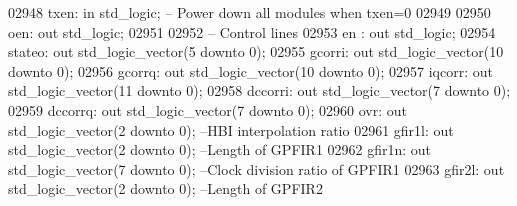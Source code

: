 \begin{DoxyCode}
02948         txen: \textcolor{keywordflow}{in} \textcolor{comment}{std\_logic}; \textcolor{keyword}{-- Power down all modules when txen=0}
02949         
02950         oen: \textcolor{keywordflow}{out} \textcolor{comment}{std\_logic};
02951         
02952 \textcolor{keyword}{        -- Control lines        }
02953         en      : \textcolor{keywordflow}{out} \textcolor{comment}{std\_logic};
02954         stateo: \textcolor{keywordflow}{out} \textcolor{comment}{std\_logic\_vector}(\textcolor{vhdllogic}{}\textcolor{vhdllogic}{5} \textcolor{keywordflow}{downto} \textcolor{vhdllogic}{}\textcolor{vhdllogic}{0});
02955         gcorri: \textcolor{keywordflow}{out} \textcolor{comment}{std\_logic\_vector}(\textcolor{vhdllogic}{}\textcolor{vhdllogic}{10} \textcolor{keywordflow}{downto} \textcolor{vhdllogic}{}\textcolor{vhdllogic}{0});
02956         gcorrq: \textcolor{keywordflow}{out} \textcolor{comment}{std\_logic\_vector}(\textcolor{vhdllogic}{}\textcolor{vhdllogic}{10} \textcolor{keywordflow}{downto} \textcolor{vhdllogic}{}\textcolor{vhdllogic}{0});
02957         iqcorr: \textcolor{keywordflow}{out} \textcolor{comment}{std\_logic\_vector}(\textcolor{vhdllogic}{}\textcolor{vhdllogic}{11} \textcolor{keywordflow}{downto} \textcolor{vhdllogic}{}\textcolor{vhdllogic}{0});
02958         dccorri: \textcolor{keywordflow}{out} \textcolor{comment}{std\_logic\_vector}(\textcolor{vhdllogic}{}\textcolor{vhdllogic}{7} \textcolor{keywordflow}{downto} \textcolor{vhdllogic}{}\textcolor{vhdllogic}{0});
02959         dccorrq: \textcolor{keywordflow}{out} \textcolor{comment}{std\_logic\_vector}(\textcolor{vhdllogic}{}\textcolor{vhdllogic}{7} \textcolor{keywordflow}{downto} \textcolor{vhdllogic}{}\textcolor{vhdllogic}{0});
02960         ovr: \textcolor{keywordflow}{out} \textcolor{comment}{std\_logic\_vector}(\textcolor{vhdllogic}{}\textcolor{vhdllogic}{2} \textcolor{keywordflow}{downto} \textcolor{vhdllogic}{}\textcolor{vhdllogic}{0});  \textcolor{keyword}{--HBI interpolation ratio }
02961         gfir1l: \textcolor{keywordflow}{out} \textcolor{comment}{std\_logic\_vector}(\textcolor{vhdllogic}{}\textcolor{vhdllogic}{2} \textcolor{keywordflow}{downto} \textcolor{vhdllogic}{}\textcolor{vhdllogic}{0});       \textcolor{keyword}{--Length of GPFIR1}
02962         gfir1n: \textcolor{keywordflow}{out} \textcolor{comment}{std\_logic\_vector}(\textcolor{vhdllogic}{}\textcolor{vhdllogic}{7} \textcolor{keywordflow}{downto} \textcolor{vhdllogic}{}\textcolor{vhdllogic}{0});       \textcolor{keyword}{--Clock division ratio of GPFIR1}
02963         gfir2l: \textcolor{keywordflow}{out} \textcolor{comment}{std\_logic\_vector}(\textcolor{vhdllogic}{}\textcolor{vhdllogic}{2} \textcolor{keywordflow}{downto} \textcolor{vhdllogic}{}\textcolor{vhdllogic}{0});       \textcolor{keyword}{--Length of GPFIR2}

\end{DoxyCode}
